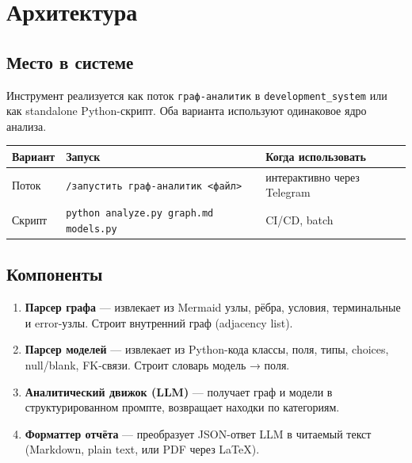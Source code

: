 \documentclass[11pt, a4paper, oneside]{article}
\begin{document}
\section{Архитектура}

\subsection{Место в системе}

Инструмент реализуется как поток \texttt{граф-аналитик} в
\texttt{development\_system} или как standalone Python-скрипт.
Оба варианта используют одинаковое ядро анализа.

\begin{center}
\begin{tabular}{lll}
  \toprule
  \textbf{Вариант} & \textbf{Запуск} & \textbf{Когда использовать} \\
  \midrule
  Поток & \texttt{/запустить граф-аналитик <файл>} & интерактивно через Telegram \\
  Скрипт & \texttt{python analyze.py graph.md models.py} & CI/CD, batch \\
  \bottomrule
\end{tabular}
\end{center}

\subsection{Компоненты}

\begin{enumerate}
  \item \textbf{Парсер графа} — извлекает из Mermaid узлы, рёбра, условия,
    терминальные и error-узлы. Строит внутренний граф (adjacency list).

  \item \textbf{Парсер моделей} — извлекает из Python-кода классы, поля,
    типы, choices, null/blank, FK-связи. Строит словарь {модель → поля}.

  \item \textbf{Аналитический движок (LLM)} — получает граф и модели в
    структурированном промпте, возвращает находки по категориям.

  \item \textbf{Форматтер отчёта} — преобразует JSON-ответ LLM в
    читаемый текст (Markdown, plain text, или PDF через LaTeX).
\end{enumerate}
\end{document}
